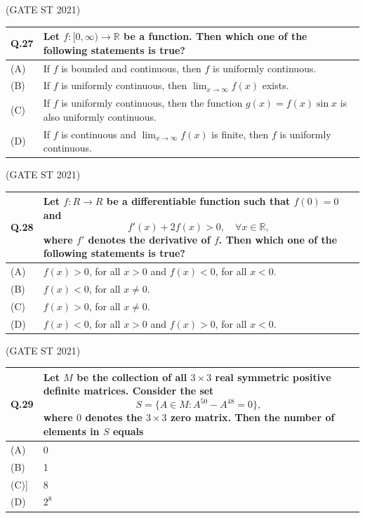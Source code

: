 \documentclass[journal,12pt,onecolumn]{IEEEtran}
\theoremstyle{remark}
\begin{document}
\bigskip
\hfill (GATE ST 2021)
\\
\begin{tabular}{|p{1cm}|p{14cm}|}
\hline
\textbf{Q.27} &
Let $f: [0, \infty) \to \mathbb{R}$ be a function. Then which one of the following statements is true?\\
\hline

(A) & If $f$ is bounded and continuous, then $f$ is uniformly continuous.\\
\hline
(B) & If $f$ is uniformly continuous, then $\lim_{x \to \infty} f(x)$ exists.\\
\hline
(C) & If $f$ is uniformly continuous, then the function $g(x) = f(x) \sin x$ is also uniformly continuous.\\
\hline
(D) & If $f$ is continuous and $\lim_{x \to \infty} f(x)$ is finite, then $f$ is uniformly continuous.\\
\hline
\end{tabular}
\bigskip
\hfill (GATE ST 2021)
\\
\begin{tabular}{|p{1cm}|p{14cm}|}
\hline
\textbf{Q.28} &
Let $f: {R} \xrightarrow{}{R}$ be a differentiable function such that $f(0) = 0$ and
$$
f'(x) + 2 f(x) > 0, \quad \forall x \in \mathbb{R},
$$
where $f'$ denotes the derivative of $f$. Then which one of the following statements is true? \\
\hline

(A) & $f(x) > 0$, for all $x > 0$ and $f(x) < 0$, for all $x < 0$.\\
\hline
(B) & $f(x) < 0$, for all $x \neq 0$.\\ 
\hline
(C) & $f(x) > 0$, for all $x \neq 0$.\\
\hline
(D) & $f(x) < 0$, for all $x > 0$ and $f(x) > 0$, for all $x < 0$.\\
\hline
\end{tabular}
\bigskip
\hfill (GATE ST 2021)
\\
\begin{tabular}{|p{1cm}|p{14cm}|}
\hline
\textbf{Q.29} &
Let $M$ be the collection of all $3 \times 3$ real symmetric positive definite matrices. Consider the set
$$
S = \{ A \in M : A^{50} - A^{48} = 0 \},
$$
where $0$ denotes the $3 \times 3$ zero matrix. Then the number of elements in $S$ equals\\
\hline

(A) & 0\\
\hline
(B) & 1\\
\hline
(C)] & 8\\
\hline
(D) &  $2^{8}$\\
\hline
\end{tabular}
\end{document}

